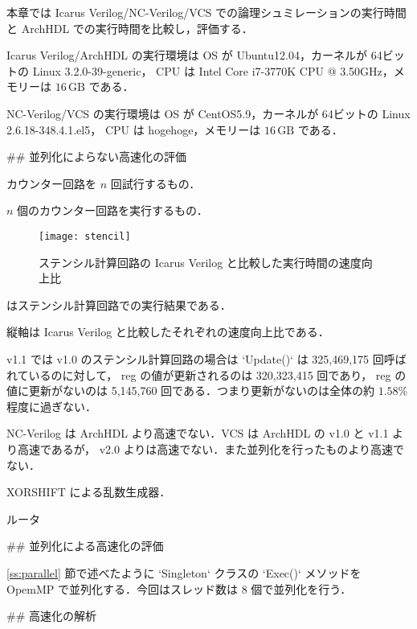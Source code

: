 本章では Icarus Verilog/NC-Verilog/VCS での論理シュミレーションの実行時間と
ArchHDL での実行時間を比較し，評価する．

Icarus Verilog/ArchHDL の実行環境は OS が Ubuntu12.04，カーネルが 64ビットの
Linux 3.2.0-39-generic， CPU は
Intel Core i7-3770K CPU @ 3.50GHz，メモリーは
$16\,\mathrm{GB}$ である．

NC-Verilog/VCS の実行環境は OS が CentOS5.9，カーネルが 64ビットの
Linux 2.6.18-348.4.1.el5， CPU は
hogehoge，メモリーは
$16\,\mathrm{GB}$ である．


## 並列化によらない高速化の評価

カウンター回路を $n$ 回試行するもの．

$n$ 個のカウンター回路を実行するもの．

\begin{figure}[t]
 \centering
 \texttt{[image: stencil]}
 \caption{ステンシル計算回路の Icarus Verilog と比較した実行時間の速度向上比}
 \label{fig:stencil}
\end{figure}

 はステンシル計算回路での実行結果である．

縦軸は Icarus Verilog と比較したそれぞれの速度向上比である．

v1.1 では v1.0 のステンシル計算回路の場合は `Update()` は 325,469,175 回呼ばれているのに対して，
reg の値が更新されるのは 320,323,415 回であり，
reg の値に更新がないのは 5,145,760 回である．つまり更新がないのは全体の約
$1.58\%$ 程度に過ぎない．

NC-Verilog は ArchHDL より高速でない．VCS は ArchHDL の v1.0 と v1.1 より高速であるが， v2.0 よりは高速でない．また並列化を行ったものより高速でない．





XORSHIFT による乱数生成器．




ルータ





## 並列化による高速化の評価

\ref{ss:parallel} 節で述べたように `Singleton` クラスの `Exec()`
メソッドを OpemMP で並列化する．今回はスレッド数は 8 個で並列化を行う．







## 高速化の解析








